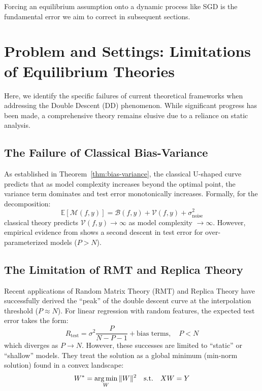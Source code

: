 \documentclass[
  journal=largetwo,
  year=2025,
  volume=37,
]{cup-journal}
\begin{document}
Forcing an equilibrium assumption onto a dynamic process like SGD is the fundamental error we aim to correct in subsequent sections.

\section{Problem and Settings: Limitations of Equilibrium Theories}

Here, we identify the specific failures of current theoretical frameworks when addressing the Double Descent (DD) phenomenon. While significant progress has been made, a comprehensive theory remains elusive due to a reliance on static analysis.

\subsection{The Failure of Classical Bias-Variance}

As established in Theorem~\ref{thm:bias-variance}, the classical U-shaped curve predicts that as model complexity increases beyond the optimal point, the variance term dominates and test error monotonically increases. Formally, for the decomposition:
\begin{equation}
    \mathbb{E}[\mathcal{M}(f,y)] = \mathcal{B}(f,y) + \mathcal{V}(f,y) + \sigma^2_{\text{noise}}
\end{equation}
classical theory predicts $\mathcal{V}(f,y) \to \infty$ as model complexity $\to \infty$. However, empirical evidence from \cite{belkin_reconciling_2019,nakkiran_deep_2019} shows a second descent in test error for over-parameterized models ($P > N$).

\subsection{The Limitation of RMT and Replica Theory}

Recent applications of Random Matrix Theory (RMT) and Replica Theory have successfully derived the ``peak'' of the double descent curve at the interpolation threshold ($P \approx N$). For linear regression with random features, the expected test error takes the form:
\begin{equation}
    R_{\text{test}} = \sigma^2 \frac{P}{N - P - 1} + \text{bias terms}, \quad P < N
\end{equation}
which diverges as $P \to N$. However, these successes are limited to ``static'' or ``shallow'' models. They treat the solution as a global minimum (min-norm solution) found in a convex landscape:
\begin{equation}
    W^* = \operatorname*{arg\,min}_W \|W\|^2 \quad \text{s.t.} \quad XW = Y
\end{equation}
\end{document}
